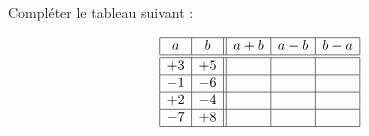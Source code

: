 
\begin{exercice}\label{exosmath-0747}

    Compléter le tableau suivant :

    \begin{equation*}
        \begin{array}[]{|c|c||c|c|c|}
            \hline
            a&b&a+b&a-b&b-a\\
            \hline\hline
            +3&+5&&&\\
            \hline
            -1&-6&&&\\
            \hline
            +2&-4&&&\\
            \hline
            -7&+8&&&\\
            \hline
        \end{array}
    \end{equation*}

\end{exercice}
